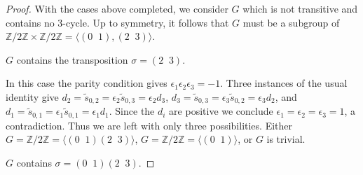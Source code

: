 \documentclass[12pt,psamsfonts]{amsart}
\newcommand{\e}{{\epsilon}}
\newcommand{\Z}{\mathbb Z}
\numberwithin{equation}{section}
\theoremstyle{definition}
\begin{document}
\begin{proof}
\vspace{.5cm}

With the cases above completed, we consider $G$ which is not
transitive and contains no 3-cycle. Up to symmetry, it follows
that $G$ must be a subgroup of $\Z/2\Z \times \Z/2\Z =\langle
(0\;\;1), (2\;\; 3)\rangle$.

\vspace{.5cm}

 $G$ contains the transposition
$\sigma=(2\;\; 3)$.

\vspace{.5cm}

In this case the parity condition gives $\e_1\e_2\e_3=-1$. Three
instances of the usual identity give $d_2=\tilde s_{0,2}=\e_2
\tilde s_{0,3}=\e_2 d_3$, $d_3=\tilde s_{0,3}=\e_3 \tilde
s_{0,2}=\e_3 d_2$, and $d_1=\tilde s_{0,1} = \e_1 \tilde
s_{0,1}=\e_1 d_1$. Since the $d_i$ are positive we conclude
$\e_1=\e_2=\e_3=1$, a contradiction. Thus we are left with only
three possibilities. Either $G=\Z/2\Z=\langle (0\;\; 1)(2\;\;
3)\rangle$, $G=\Z/2\Z=\langle (0\;\; 1)\rangle$, or $G$ is
trivial.

\vspace{.5cm}

 $G$ contains $\sigma=(0\;\; 1)(2\;\; 3)$.

\vspace{.5cm}


\end{proof}
\end{document}
